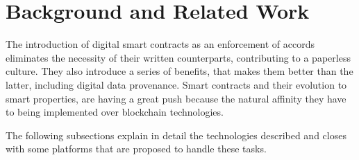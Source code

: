 \section{Background and Related Work}
\label{sec:background}

The introduction of digital smart contracts as an enforcement of accords eliminates the necessity of their written counterparts, contributing to a paperless culture. They also introduce a series of benefits, that makes them better than the latter, including digital data provenance. Smart contracts and their evolution to smart properties, are having a great push because the natural affinity they have to being implemented over blockchain technologies. 

The following subsections explain in detail the technologies described and closes with some platforms that are proposed to handle these tasks.




